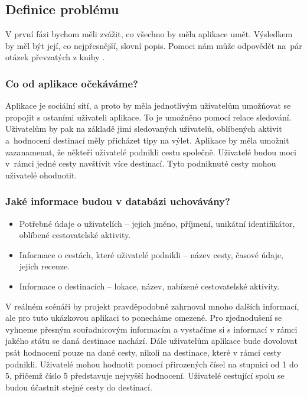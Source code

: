 \documentclass[
  program=infoi,
  biblatex=true,
  figures=true,
  glossaries=false,
  index,
  sourcecodes=true
]{kidiplom}
\begin{document}
\subsection{Definice problému}
\label{sec:problem-definition}
V první fázi bychom měli zvážit, co všechno by měla aplikace umět. Výsledkem by měl být její, co nejpřesnější, slovní popis. Pomoci nám může odpovědět na~pár otázek převzatých z knihy \citep{inAction}.

\subsubsection{Co od aplikace očekáváme?}
Aplikace je sociální sítí, a proto by měla jednotlivým uživatelům umožňovat se propojit s ostaními uživateli aplikace. To je umožněno pomocí relace sledování. Uživatelům by pak na základě jimi sledovaných uživatelů, oblíbených aktivit a~hodnocení destinací měly přicházet tipy na výlet. Aplikace by měla umožnit zazanamenat, že někteří uživatelé podnikli cestu společně. Uživatelé budou moci v~rámci jedné cesty navštívit více destinací. Tyto podniknuté cesty mohou uživatelé ohodnotit.

\subsubsection{Jaké informace budou v databázi uchovávány?}
\begin{itemize}
  \item Potřebné údaje o uživatelích -- jejich jméno, příjmení, unikátní identifikátor, oblíbené cestovatelské aktivity.
  \item Informace o cestách, které uživatelé podnikli -- název cesty, časové údaje, jejich recenze.
  \item Informace o destinacích -- lokace, název, nabízené cestovatelské aktivity.
\end{itemize}
V reálném scénáři by projekt pravděpodobně zahrnoval mnoho dalších informací, ale pro tuto ukázkovou aplikaci to ponecháme omezené. Pro zjednodušení se vyhneme přesným souřadnicovým informacím a vystačíme si s informací v rámci jakého státu se daná destinace nachází. Dále uživatelům aplikace bude dovolovat psát hodnocení pouze na dané cesty, nikoli na destinace, které v rámci cesty podnikli. Uživatelé mohou hodnotit pomocí přirozených čísel na stupnici od 1 do 5, přičemž číslo 5 představuje nejvyšší hodnocení. Uživatelé cestující spolu se budou účastnit stejné cesty do destinací.
\end{document}
